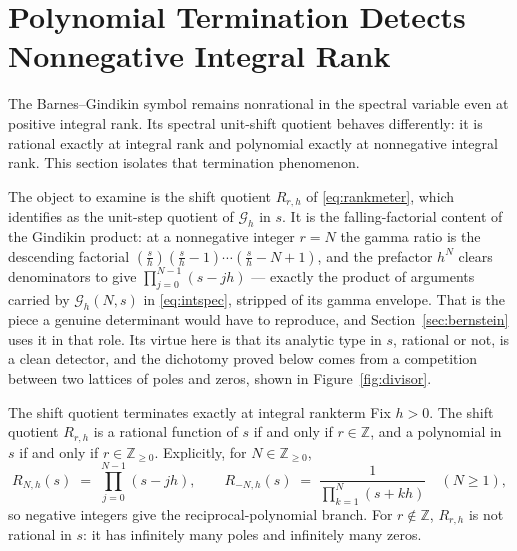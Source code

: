 \documentclass[11pt,letterpaper]{article}
\newcommand{\Gc}{\mathcal{G}}               %
\newcommand{\Zint}{\mathbb{Z}}
\newcommand{\Rm}{R}                          %
\begin{document}
\section{Polynomial Termination Detects Nonnegative Integral Rank}
\label{sec:term}

The Barnes--Gindikin symbol remains nonrational in the spectral variable even
at positive integral rank. Its spectral unit-shift quotient behaves differently:
it is rational exactly at integral rank and polynomial exactly at nonnegative
integral rank. This section isolates that termination phenomenon.

The object to examine is the shift quotient $\Rm_{r,h}$ of \eqref{eq:rankmeter},
which  identifies as the unit-step quotient of $\Gc_h$ in $s$.
It is the falling-factorial content of the Gindikin product: at a nonnegative
integer $r=N$ the gamma ratio is the descending factorial
$(\tfrac{s}{h})(\tfrac{s}{h}-1)\cdots(\tfrac{s}{h}-N+1)$, and the prefactor
$h^{N}$ clears denominators to give $\prod_{j=0}^{N-1}(s-jh)$ --- exactly the
product of arguments carried by $\Gc_h(N,s)$ in \eqref{eq:intspec}, stripped of
its gamma envelope. That is the piece a genuine determinant would have to
reproduce, and Section~\ref{sec:bernstein} uses it in that role. Its virtue here
is that its analytic type in $s$, rational or not, is a clean detector, and the
dichotomy proved below comes from a competition between two lattices of poles and
zeros, shown in Figure~\ref{fig:divisor}.


\begin{theorem}{The shift quotient terminates exactly at integral rank}{term}
Fix $h>0$. The shift quotient $\Rm_{r,h}$ is a rational function of $s$ if and
only if $r\in\Zint$, and a polynomial in $s$ if and only if $r\in\Zint_{\ge 0}$.
Explicitly, for $N\in\Zint_{\ge 0}$,
\begin{equation}
  \Rm_{N,h}(s)\;=\;\prod_{j=0}^{N-1}(s-jh),
  \qquad
  \Rm_{-N,h}(s)\;=\;\frac{1}{\displaystyle\prod_{k=1}^{N}(s+kh)}\quad(N\ge 1),
  \label{eq:term-explicit}
\end{equation}
so negative integers give the reciprocal-polynomial branch. For $r\notin\Zint$,
$\Rm_{r,h}$ is not rational in $s$: it has infinitely many poles and
infinitely many zeros.
\end{theorem}
\end{document}
